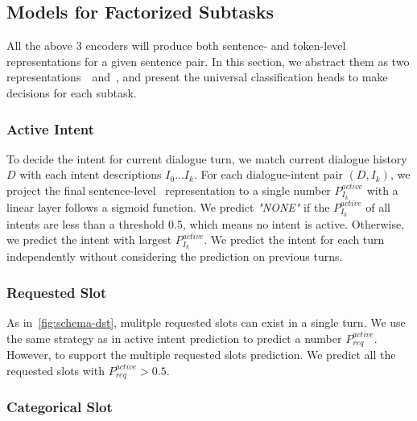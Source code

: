 \subsection{Models for Factorized Subtasks}
\label{ssec:models-overview}
All the above 3 encoders will produce both sentence- and token-level
representations for a given sentence pair. In this section,
we abstract them as two representations~\CLS~and~\TOK, and present the
universal classification heads to make decisions for each subtask.

\subsubsection{Active Intent}
\label{sssec:sgd:active-intent}

To decide the intent for current dialogue turn, we match current dialogue
history $D$ with each intent descriptions $I_{0}...I_{k}$. For each
dialogue-intent pair $(D,I_{k})$, we project the final sentence-level
\CLS~representation to a single number $P_{I_{k}}^{active}$ with a
linear layer follows a sigmoid function. We predict \textit{"NONE"} if
the $P_{I_{k}}^{active}$ of all intents are less than a threshold 0.5,
which means no intent is active. Otherwise, we predict the intent with
largest $P_{I_{k}}^{active}$. We predict the intent for each turn
independently without considering the prediction on previous turns.

\subsubsection{Requested Slot}
\label{sssec:sgd:requested-slot}

As in~\autoref{fig:schema-dst}, mulitple requested slots can exist
in a single turn. We use the same strategy as in active intent
prediction to predict a number $P_{req}^{active}$. However, to support
the multiple requested slots prediction. We predict all the requested
slots with $P_{req}^{active} > 0.5$.

\subsubsection{Categorical Slot}
\label{sssec:sgd:categorical-slot}

